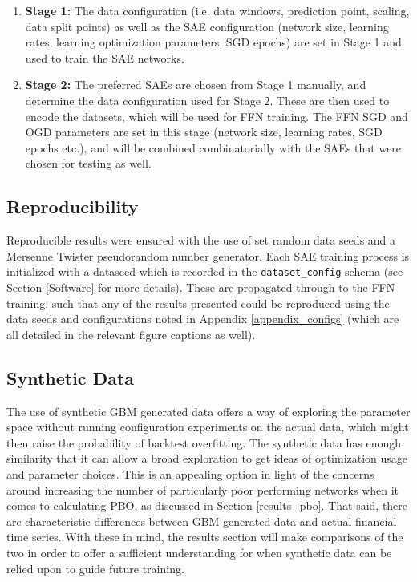 \documentclass[a4paper,11pt,oneside]{article}
\theoremstyle{plain}
\theoremstyle{definition}
\begin{document}
	\begin{enumerate}
		\item \textbf{Stage 1:} The data configuration (i.e. data windows, prediction point, scaling, data split points) as well as the SAE configuration (network size, learning rates, learning optimization parameters, SGD epochs) are set in Stage 1 and used to train the SAE networks.
		\item \textbf{Stage 2:} The preferred SAEs are chosen from Stage 1 manually, and determine the data configuration used for Stage 2. These are then used to encode the datasets, which will be used for FFN training. The FFN SGD and OGD parameters are set in this stage (network size, learning rates, SGD epochs etc.), and will be combined combinatorially with the SAEs that were chosen for testing as well.
	\end{enumerate}
	
	\subsection{Reproducibility}\label{proc_reproducibility}
	
	Reproducible results were ensured with the use of set random data seeds and a Mersenne Twister pseudorandom number generator. Each SAE training process is initialized with a dataseed which is recorded in the \texttt{dataset\_config} schema (see Section \ref{Software} for more details). These are propagated through to the FFN training, such that any of the results presented could be reproduced using the data seeds and configurations noted in Appendix \ref{appendix_configs} (which are all detailed in the relevant figure captions as well).
	
	\subsection{Synthetic Data}\label{proc_synthetic}
	
	The use of synthetic GBM generated data offers a way of exploring the parameter space without running configuration experiments on the actual data, which might then raise the probability of backtest overfitting. The synthetic data has enough similarity that it can allow a broad exploration to get ideas of optimization usage and parameter choices. This is an appealing option in light of the concerns around increasing the number of particularly poor performing networks when it comes to calculating PBO, as discussed in Section \ref{results_pbo}. That said, there are characteristic differences between GBM generated data and actual financial time series. With these in mind, the results section will make comparisons of the two in order to offer a sufficient understanding for when synthetic data can be relied upon to guide future training.\newline
	
\end{document}
